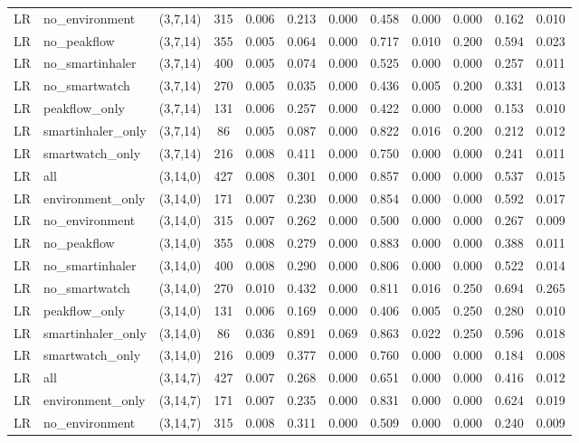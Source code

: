 \begin{longtable}{llcccccccccc}
LR & no\_environment & (3,7,14) & 315 & 0.006 & 0.213 & 0.000 & 0.458 & 0.000 & 0.000 & 0.162 & 0.010 \\
LR & no\_peakflow & (3,7,14) & 355 & 0.005 & 0.064 & 0.000 & 0.717 & 0.010 & 0.200 & 0.594 & 0.023 \\
LR & no\_smartinhaler & (3,7,14) & 400 & 0.005 & 0.074 & 0.000 & 0.525 & 0.000 & 0.000 & 0.257 & 0.011 \\
LR & no\_smartwatch & (3,7,14) & 270 & 0.005 & 0.035 & 0.000 & 0.436 & 0.005 & 0.200 & 0.331 & 0.013 \\
LR & peakflow\_only & (3,7,14) & 131 & 0.006 & 0.257 & 0.000 & 0.422 & 0.000 & 0.000 & 0.153 & 0.010 \\
LR & smartinhaler\_only & (3,7,14) & 86 & 0.005 & 0.087 & 0.000 & 0.822 & 0.016 & 0.200 & 0.212 & 0.012 \\
LR & smartwatch\_only & (3,7,14) & 216 & 0.008 & 0.411 & 0.000 & 0.750 & 0.000 & 0.000 & 0.241 & 0.011 \\
LR & all & (3,14,0) & 427 & 0.008 & 0.301 & 0.000 & 0.857 & 0.000 & 0.000 & 0.537 & 0.015 \\
LR & environment\_only & (3,14,0) & 171 & 0.007 & 0.230 & 0.000 & 0.854 & 0.000 & 0.000 & 0.592 & 0.017 \\
LR & no\_environment & (3,14,0) & 315 & 0.007 & 0.262 & 0.000 & 0.500 & 0.000 & 0.000 & 0.267 & 0.009 \\
LR & no\_peakflow & (3,14,0) & 355 & 0.008 & 0.279 & 0.000 & 0.883 & 0.000 & 0.000 & 0.388 & 0.011 \\
LR & no\_smartinhaler & (3,14,0) & 400 & 0.008 & 0.290 & 0.000 & 0.806 & 0.000 & 0.000 & 0.522 & 0.014 \\
LR & no\_smartwatch & (3,14,0) & 270 & 0.010 & 0.432 & 0.000 & 0.811 & 0.016 & 0.250 & 0.694 & 0.265 \\
LR & peakflow\_only & (3,14,0) & 131 & 0.006 & 0.169 & 0.000 & 0.406 & 0.005 & 0.250 & 0.280 & 0.010 \\
LR & smartinhaler\_only & (3,14,0) & 86 & 0.036 & 0.891 & 0.069 & 0.863 & 0.022 & 0.250 & 0.596 & 0.018 \\
LR & smartwatch\_only & (3,14,0) & 216 & 0.009 & 0.377 & 0.000 & 0.760 & 0.000 & 0.000 & 0.184 & 0.008 \\
LR & all & (3,14,7) & 427 & 0.007 & 0.268 & 0.000 & 0.651 & 0.000 & 0.000 & 0.416 & 0.012 \\
LR & environment\_only & (3,14,7) & 171 & 0.007 & 0.235 & 0.000 & 0.831 & 0.000 & 0.000 & 0.624 & 0.019 \\
LR & no\_environment & (3,14,7) & 315 & 0.008 & 0.311 & 0.000 & 0.509 & 0.000 & 0.000 & 0.240 & 0.009 \\

\end{longtable}
